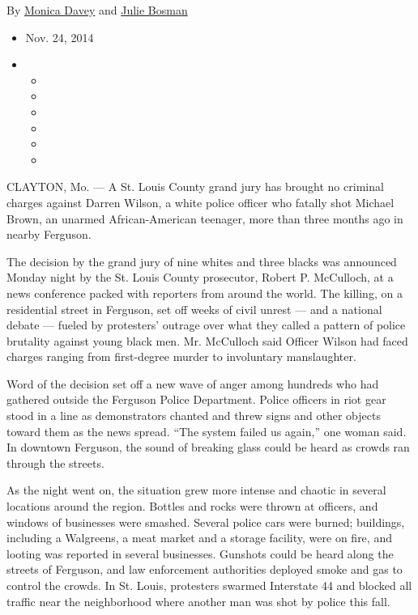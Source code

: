 By \href{http://www.nytimes.com/by/monica-davey}{Monica Davey} and
\href{http://www.nytimes.com/by/julie-bosman}{Julie Bosman}

\begin{itemize}
\item
  Nov. 24, 2014
\item
  \begin{itemize}
  \item
  \item
  \item
  \item
  \item
  \item
  \end{itemize}
\end{itemize}

CLAYTON, Mo. --- A St. Louis County grand jury has brought no criminal
charges against Darren Wilson, a white police officer who fatally shot
Michael Brown, an unarmed African-American teenager, more than three
months ago in nearby Ferguson.

The decision by the grand jury of nine whites and three blacks was
announced Monday night by the St. Louis County prosecutor, Robert P.
McCulloch, at a news conference packed with reporters from around the
world. The killing, on a residential street in Ferguson, set off weeks
of civil unrest --- and a national debate --- fueled by protesters'
outrage over what they called a pattern of police brutality against
young black men. Mr. McCulloch said Officer Wilson had faced charges
ranging from first-degree murder to involuntary manslaughter.

Word of the decision set off a new wave of anger among hundreds who had
gathered outside the Ferguson Police Department. Police officers in riot
gear stood in a line as demonstrators chanted and threw signs and other
objects toward them as the news spread. ``The system failed us again,''
one woman said. In downtown Ferguson, the sound of breaking glass could
be heard as crowds ran through the streets.

As the night went on, the situation grew more intense and chaotic in
several locations around the region. Bottles and rocks were thrown at
officers, and windows of businesses were smashed. Several police cars
were burned; buildings, including a Walgreens, a meat market and a
storage facility, were on fire, and looting was reported in several
businesses. Gunshots could be heard along the streets of Ferguson, and
law enforcement authorities deployed smoke and gas to control the
crowds. In St. Louis, protesters swarmed Interstate 44 and blocked all
traffic near the neighborhood where another man was shot by police this
fall.

